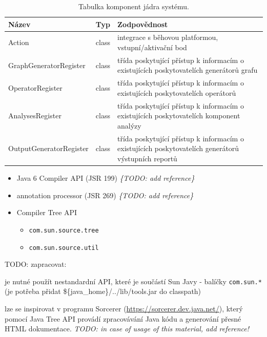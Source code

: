 \begin{table}
  \caption{Tabulka komponent jádra systému. \label{design-archval_core_components}}
  \begin{center}
    \begin{tabular}{ | l | l | p{8cm} | }
      \hline
      \textbf{Název} & \textbf{Typ} & \textbf{Zodpovědnost} \\
      \hline
      \hline
      Action & class & integrace s běhovou platformou, vstupní/aktivační bod \\
      GraphGeneratorRegister & class & třída poskytující přístup k informacím o existujících poskytovatelích generátorů grafu \\ \hline
      OperatorRegister & class & třída poskytující přístup k informacím o existujících poskytovatelích operátorů \\ \hline
      AnalysesRegister & class & třída poskytující přístup k informacím o existujících poskytovatelích komponent analýzy \\ \hline
      OutputGeneratorRegister & class & třída poskytující přístup k informacím o existujících poskytovatelích generátorů výstupních reportů \\ \hline
      \hline
    \end{tabular}
  \end{center}

\end{table}


\begin{itemize}
\item Java 6 Compiler API (JSR 199) \emph{\{TODO: add reference\}}
\item annotation processor (JSR 269) \emph{\{TODO: add reference\}}
\item Compiler Tree API
  \begin{itemize}
  \item \verb+com.sun.source.tree+
  \item \verb+com.sun.source.util+
  \end{itemize}
\end{itemize}

TODO: zapracovat:

je nutné použít nestandardní API, které je součástí Sun Javy - balíčky \verb+com.sun.*+ (je potřeba přidat \$\{java\_home\}/../lib/tools.jar do classpath)

lze se inspirovat v programu Sorcerer (\href{https://sorcerer.dev.java.net/}{https://sorcerer.dev.java.net/}), který pomocí Java Tree API provádí zpracovávání Java kódu a generování přesné HTML dokumentace. \emph{TODO: in case of usage of this material, add reference!}

